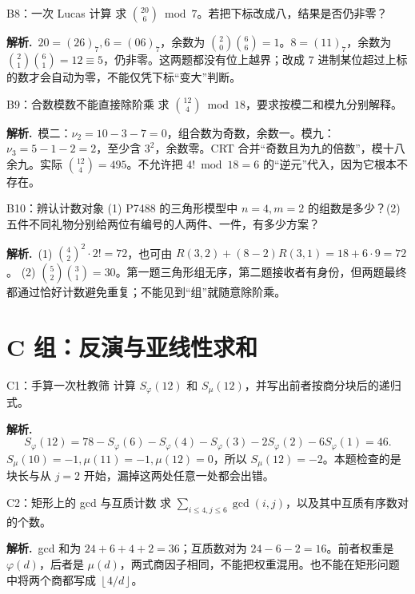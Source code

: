 \documentclass[UTF8,a4paper,11pt,twoside,openright,fontset=fandol]{ctexbook}
\theoremstyle{definition}
\newcommand{\floor}[1]{\left\lfloor #1\right\rfloor}
\newcommand{\sol}{\par\noindent\textbf{解析.}\ }
\begin{document}
\begin{problem}{B8：一次 Lucas 计算}
求 $\binom{20}{6}\bmod7$。若把下标改成八，结果是否仍非零？
\end{problem}

\sol $20=(26)_7,6=(06)_7$，余数为 $\binom20\binom66=1$。$8=(11)_7$，余数为 $\binom21\binom61=12\equiv5$，仍非零。这两题都没有位上越界；改成 $7$ 进制某位超过上标的数才会自动为零，不能仅凭下标“变大”判断。


\begin{problem}{B9：合数模数不能直接除阶乘}
求 $\binom{12}{4}\bmod18$，要求按模二和模九分别解释。
\end{problem}

\sol 模二：$\nu_2=10-3-7=0$，组合数为奇数，余数一。模九：$\nu_3=5-1-2=2$，至少含 $3^2$，余数零。CRT 合并“奇数且为九的倍数”，模十八余九。实际 $\binom{12}{4}=495$。不允许把 $4!\bmod18=6$ 的“逆元”代入，因为它根本不存在。


\begin{problem}{B10：辨认计数对象}
(1) P7488 的三角形模型中 $n=4,m=2$ 的组数是多少？(2) 五件不同礼物分别给两位有编号的人两件、一件，有多少方案？
\end{problem}

\sol (1) $\binom42^2\cdot2!=72$，也可由 $R(3,2)+(8-2)R(3,1)=18+6\cdot9=72$。 (2) $\binom52\binom31=30$。第一题三角形组无序，第二题接收者有身份，但两题最终都通过恰好计数避免重复；不能见到“组”就随意除阶乘。


\section{C 组：反演与亚线性求和}
\begin{problem}{C1：手算一次杜教筛}
计算 $S_\varphi(12)$ 和 $S_\mu(12)$，并写出前者按商分块后的递归式。
\end{problem}

\sol
\[
S_\varphi(12)=78-S_\varphi(6)-S_\varphi(4)-S_\varphi(3)-2S_\varphi(2)-6S_\varphi(1)=46.
\]
$S_\mu(10)=-1,\mu(11)=-1,\mu(12)=0$，所以 $S_\mu(12)=-2$。本题检查的是块长与从 $j=2$ 开始，漏掉这两处任意一处都会出错。


\begin{problem}{C2：矩形上的 gcd 与互质计数}
求 $\sum_{i\le4,j\le6}\gcd(i,j)$，以及其中互质有序数对的个数。
\end{problem}

\sol gcd 和为 $24+6+4+2=36$；互质数对为 $24-6-2=16$。前者权重是 $\varphi(d)$，后者是 $\mu(d)$，两式商因子相同，不能把权重混用。也不能在矩形问题中将两个商都写成 $\floor{4/d}$。
\end{document}

